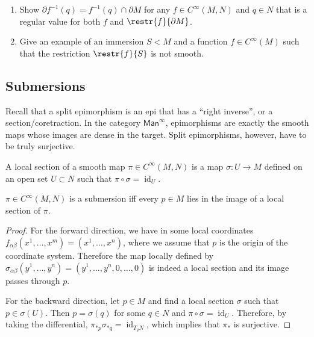 \documentclass[english,letterpaper]{article}%
\numberwithin{equation}{section}
\numberwithin{figure}{section}
\numberwithin{table}{section}
\theoremstyle{definition}
\theoremstyle{definition}
\theoremstyle{definition}
\theoremstyle{plain}
\theoremstyle{plain}
\theoremstyle{plain}
\theoremstyle{plain}
\theoremstyle{remark}
\theoremstyle{remark}
\DeclareMathOperator{\id}{id}
\begin{document}
\begin{xca}
\begin{enumerate}
    \item Show $\partial f^{-1}(q)=f^{-1}(q)\cap \partial M$ for any $f\in C^\infty(M,N)$ and $q\in N$ that is a regular value for both $f$ and $\restr{f}{\partial M}$.
    \item Give an example of an immersion $S<M$ and a function $f\in C^\infty(M)$ such that the restriction $\restr{f}{S}$ is not smooth.
\end{enumerate}

\end{xca}




\subsection{Submersions}

Recall that a split epimorphism is an epi that has a ``right inverse'', or a section/coretraction. In the category $\mathsf{Man}^\infty$, epimorphisms are exactly the smooth maps whose images are dense in the target. Split epimorphisms, however, have to be truly surjective.

\begin{defn}
A local section of a smooth map $\pi\in C^\infty(M,N)$ is a map $\sigma :U\to M$ defined on an open set $U\subset N$ such that $\pi\circ\sigma =\id_U$.
\end{defn}


\begin{thm}
$\pi\in C^\infty(M,N)$ is a submersion iff every $p\in M$ lies in the image of a local section of $\pi$.
\end{thm}
\begin{proof}
For the forward direction, we have in some local coordinates $f_{\alpha\beta}(x^1,\ldots,x^m)=(x^1,\ldots,x^n)$, where we assume that $p$ is the origin of the coordinate system. Therefore the map locally defined by $\sigma_{\alpha\beta}(y^1,\ldots,y^n)=(y^1,\ldots,y^n,0,\ldots,0)$ is indeed a local section and its image passes through $p$.

For the backward direction, let $p\in M$ and find a local section $\sigma$ such that $p\in \sigma(U)$. Then $p=\sigma(q)$ for some $q\in N$ and $\pi\circ\sigma=\id_U$. Therefore, by taking the differential, $\pi_{\ast p} \sigma_{\ast q}=\id_{T_q N}$, which implies that $\pi_\ast$ is surjective.
\end{proof}
\end{document}
